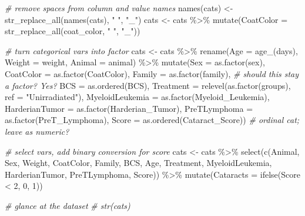 \documentclass[
]{article}
\newenvironment{Shaded}{\begin{snugshade}}{\end{snugshade}}
\newcommand{\AttributeTok}[1]{\textcolor[rgb]{0.77,0.63,0.00}{#1}}
\newcommand{\CommentTok}[1]{\textcolor[rgb]{0.56,0.35,0.01}{\textit{#1}}}
\newcommand{\DecValTok}[1]{\textcolor[rgb]{0.00,0.00,0.81}{#1}}
\newcommand{\FunctionTok}[1]{\textcolor[rgb]{0.00,0.00,0.00}{#1}}
\newcommand{\NormalTok}[1]{#1}
\newcommand{\OtherTok}[1]{\textcolor[rgb]{0.56,0.35,0.01}{#1}}
\newcommand{\SpecialCharTok}[1]{\textcolor[rgb]{0.00,0.00,0.00}{#1}}
\newcommand{\StringTok}[1]{\textcolor[rgb]{0.31,0.60,0.02}{#1}}
\begin{document}
\begin{Shaded}
\begin{Highlighting}[]
\CommentTok{\# remove spaces from column and value names}
\FunctionTok{names}\NormalTok{(cats) }\OtherTok{\textless{}{-}} \FunctionTok{str\_replace\_all}\NormalTok{(}\FunctionTok{names}\NormalTok{(cats), }\StringTok{" "}\NormalTok{, }\StringTok{"\_"}\NormalTok{)}
\NormalTok{cats }\OtherTok{\textless{}{-}}\NormalTok{ cats }\SpecialCharTok{\%\textgreater{}\%}
  \FunctionTok{mutate}\NormalTok{(}\AttributeTok{CoatColor =} \FunctionTok{str\_replace\_all}\NormalTok{(coat\_color, }\StringTok{" "}\NormalTok{, }\StringTok{"\_"}\NormalTok{))}

\CommentTok{\# turn categorical vars into factor}
\NormalTok{cats }\OtherTok{\textless{}{-}}\NormalTok{ cats }\SpecialCharTok{\%\textgreater{}\%}
  \FunctionTok{rename}\NormalTok{(}\AttributeTok{Age =} \StringTok{\textasciigrave{}}\AttributeTok{age\_(days)}\StringTok{\textasciigrave{}}\NormalTok{,}
         \AttributeTok{Weight =}\NormalTok{ weight,}
         \AttributeTok{Animal =}\NormalTok{ animal) }\SpecialCharTok{\%\textgreater{}\%}
  \FunctionTok{mutate}\NormalTok{(}\AttributeTok{Sex =} \FunctionTok{as.factor}\NormalTok{(sex),}
         \AttributeTok{CoatColor =} \FunctionTok{as.factor}\NormalTok{(CoatColor),}
         \AttributeTok{Family =} \FunctionTok{as.factor}\NormalTok{(family), }\CommentTok{\# should this stay a factor? Yes?}
         \AttributeTok{BCS =} \FunctionTok{as.ordered}\NormalTok{(BCS),}
         \AttributeTok{Treatment =} \FunctionTok{relevel}\NormalTok{(}\FunctionTok{as.factor}\NormalTok{(groups), }\AttributeTok{ref =} \StringTok{"Unirradiated"}\NormalTok{),}
         \AttributeTok{MyeloidLeukemia =} \FunctionTok{as.factor}\NormalTok{(Myeloid\_Leukemia),}
         \AttributeTok{HarderianTumor =} \FunctionTok{as.factor}\NormalTok{(Harderian\_Tumor),}
         \AttributeTok{PreTLymphoma =} \FunctionTok{as.factor}\NormalTok{(PreT\_Lymphoma),}
         \AttributeTok{Score =} \FunctionTok{as.ordered}\NormalTok{(Cataract\_Score)) }\CommentTok{\# ordinal cat; leave as numeric?}

\CommentTok{\# select vars, add binary conversion for score}
\NormalTok{cats }\OtherTok{\textless{}{-}}\NormalTok{ cats }\SpecialCharTok{\%\textgreater{}\%}
  \FunctionTok{select}\NormalTok{(}\FunctionTok{c}\NormalTok{(Animal, Sex, Weight, CoatColor, Family, BCS, Age, Treatment,}
\NormalTok{           MyeloidLeukemia, HarderianTumor, PreTLymphoma, Score)) }\SpecialCharTok{\%\textgreater{}\%}
  \FunctionTok{mutate}\NormalTok{(}\AttributeTok{Cataracts =} \FunctionTok{ifelse}\NormalTok{(Score }\SpecialCharTok{\textless{}} \DecValTok{2}\NormalTok{, }\DecValTok{0}\NormalTok{, }\DecValTok{1}\NormalTok{))}

\CommentTok{\# glance at the dataset}
\CommentTok{\# str(cats)}
\end{Highlighting}
\end{Shaded}
\end{document}
